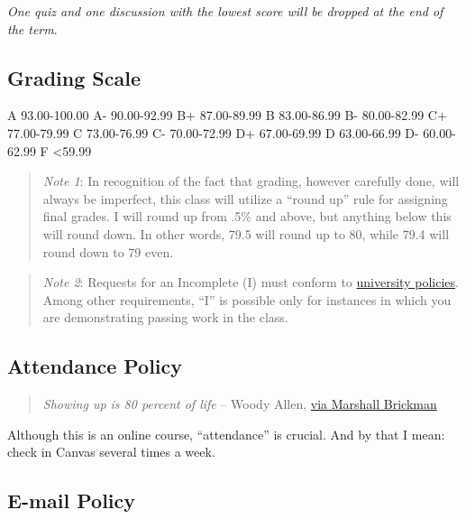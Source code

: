 \documentclass[11pt,]{article}
\begin{document}
\emph{One quiz and one discussion with the lowest score will be dropped
at the end of the term}.

\hypertarget{grading-scale}{%
\subsection{Grading Scale}\label{grading-scale}}

A 93.00-100.00 \textbar{} A- 90.00-92.99 B+ 87.00-89.99 \textbar{} B
83.00-86.99 \textbar{} B- 80.00-82.99 C+ 77.00-79.99 \textbar{} C
73.00-76.99 \textbar{} C- 70.00-72.99 D+ 67.00-69.99 \textbar{} D
63.00-66.99 \textbar{} D- 60.00-62.99 F \textless59.99

\begin{quote}
\emph{Note 1}: In recognition of the fact that grading, however
carefully done, will always be imperfect, this class will utilize a
``round up'' rule for assigning final grades. I will round up from .5\%
and above, but anything below this will round down. In other words, 79.5
will round up to 80, while 79.4 will round down to 79 even.
\end{quote}

\begin{quote}
\emph{Note 2}: Requests for an Incomplete (I) must conform to
\href{https://bit.ly/3bDxwZi}{university policies}. Among other
requirements, ``I'' is possible only for instances in which you are
demonstrating passing work in the class.
\end{quote}

\hypertarget{attendance-policy}{%
\subsection{Attendance Policy}\label{attendance-policy}}

\begin{quote}
\emph{Showing up is 80 percent of life} -- Woody Allen,
\href{http://quoteinvestigator.com/2013/06/10/showing-up/\#note-6553-1}{via
Marshall Brickman}
\end{quote}

Although this is an online course, ``attendance'' is crucial. And by
that I mean: check in Canvas several times a week.

\hypertarget{e-mail-policy}{%
\subsection{E-mail Policy}\label{e-mail-policy}}
\end{document}
